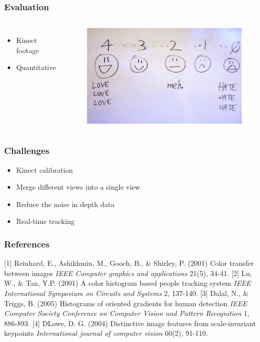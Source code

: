 \documentclass{beamer}
\begin{document}
\begin{frame}
\frametitle{Evaluation}
\begin{columns}[c]
\begin{itemize}
	\item Kinect footage
	\item Quantitative
\end{itemize}
\begin{figure}
\includegraphics[width=0.8\linewidth]{evaluation}
\end{figure}
\end{columns}
\end{frame}

\begin{frame}
\frametitle{Challenges}
\begin{itemize}
	\item Kinect calibration
	\item Merge different views into a single view
	\item Reduce the noise in depth data
	\item Real-time tracking
\end{itemize}
\end{frame}

\begin{frame}
\frametitle{References}
\footnotesize{
\begin{thebibliography}{4}
 [1] Reinhard, E., Ashikhmin, M., Gooch, B., \& Shirley, P. (2001)
\newblock Color transfer between images
\newblock \emph{IEEE Computer graphics and applications} 21(5), 34-41.
 [2] Lu, W., \& Tan, Y.P. (2001)
\newblock A color histogram based people tracking system
\newblock \emph{IEEE International Symposium on Circuits and Systems} 2, 137-140.
 [3] Dalal, N., \& Triggs, B. (2005)
\newblock Histograms of oriented gradients for human detection
\newblock \emph{IEEE Computer Society Conference on Computer Vision and Pattern Recognition} 1, 886-893.
 [4] DLowe, D. G. (2004)
\newblock Distinctive image features from scale-invariant keypoints
\newblock \emph{International journal of computer vision} 60(2), 91-110.
\end{thebibliography}
}
\end{frame}
\end{document}

